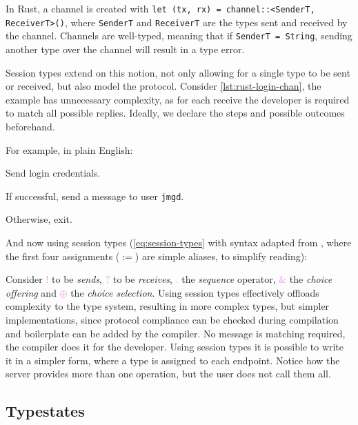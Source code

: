 In Rust, a channel is created with \texttt{let (tx, rx) = channel::<SenderT, ReceiverT>()},
where \texttt{SenderT} and \texttt{ReceiverT} are the types sent and received by the channel.
Channels are well-typed, meaning that if \texttt{SenderT = String},
sending another type over the channel will result in a type error.



Session types extend on this notion, not only allowing for a single type to be sent or received,
but also model the protocol.
Consider \autoref{lst:rust-login-chan}, the example has unnecessary complexity,
as for each receive the developer is required to match all possible replies.
Ideally, we declare the steps and possible outcomes beforehand.

For example, in plain English:
\begin{compactenum}
    \item Send login credentials.
    \item If successful, send a message to user \texttt{jmgd}.
    \item Otherwise, exit.
\end{compactenum}

And now using session types (\autoref{eq:session-types}
with syntax adapted from \autocite{Vasconcelos2006},
where the first four assignments ($:=$) are simple aliases, to simplify reading):



Consider \textcolor{violet}{$!$} to be \emph{sends}, \textcolor{violet}{$?$} to be \emph{receives}, \textcolor{violet}{$.$} the \emph{sequence} operator,
\textcolor{violet}{$\&$} the \emph{choice offering} and \textcolor{violet}{$\oplus$} the \emph{choice selection}.
Using session types effectively offloads complexity to the type system,
resulting in more complex types, but simpler implementations,
since protocol compliance can be checked during compilation and boilerplate can be added by the compiler.
No message is matching required, the compiler does it for the developer.
Using session types it is possible to write it in a simpler form, where a type is assigned to each endpoint.
Notice how the server provides more than one operation, but the user does not call them all.

\subsection{Typestates}\label{sec:typestates}

